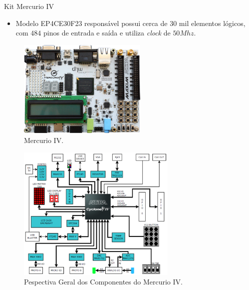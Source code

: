 	\begin{frame}{Kit Mercurio IV}
        \vspace{-1em}
		\begin{itemize}
			\item Modelo EP4CE30F23 responsável possui cerca de $ 30 $ mil elementos lógicos, com $ 484 $ pinos de entrada e saída e utiliza \textit{clock} de $50Mhz$.
		\end{itemize}

		\begin{figure}[h]
			\centering
			\includegraphics[width=0.55\textwidth]{img/imobilis/mercurio-foto.jpg}
			\caption{Mercurio IV.}
			\label{fig:mercurio-foto}
		\end{figure}
	\end{frame}

	\begin{frame}%
        \vspace{-1em}
		\begin{figure}[h]
			\centering
			\includegraphics[width=0.68\textwidth]{img/imobilis/mercurio-esquematico.png}
			\caption{Pespectiva Geral dos Componentes do Mercurio IV.}
			\label{fig:mercurio-esquematico}
		\end{figure}
	\end{frame}


